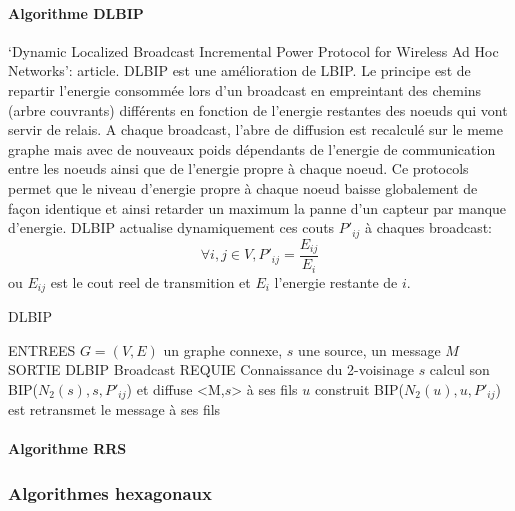 

\paragraph{Algorithme DLBIP}
`Dynamic Localized Broadcast Incremental Power Protocol for Wireless Ad Hoc Networks': article\cite{Champ2009DLBIP}.
DLBIP est une amélioration de LBIP. Le principe est de repartir l'energie consommée lors d'un broadcast en empreintant des chemins (arbre couvrants) différents en fonction de l'energie restantes des noeuds qui vont servir de relais.
A chaque broadcast, l'abre de diffusion est recalculé sur le meme graphe mais avec de nouveaux poids dépendants de l'energie de communication entre les noeuds ainsi que de l'energie propre à chaque noeud. Ce protocols permet que
le niveau d'energie propre à chaque noeud baisse globalement de façon identique et ainsi retarder un maximum la panne d'un capteur par manque d'energie.
DLBIP actualise dynamiquement ces couts $P'_{ij}$ à chaques broadcast:
$$ \forall i,j \in V, P'_{ij}=\frac{E_{ij}}{E_i}$$
ou $E_{ij}$ est le cout reel de transmition et $E_i$ l'energie restante de $i$.


\begin{algorithm}[h]
\caption{DLBIP}
\label{algo_DLBIP}
\begin{algorithmic}
\STATE ENTREES  $G=(V,E)$ un graphe connexe, $s$ une source, un message $M$
\STATE SORTIE  DLBIP Broadcast
\STATE REQUIE  Connaissance du 2-voisinage
\STATE $s$ calcul son BIP($N_2(s),s,P'_{ij}$) et diffuse <M,$s$> à ses fils
		\STATE $u$ construit BIP($N_2(u),u,P'_{ij}$) est retransmet le message à ses fils
	\ENDIF
\ENDIF
\end{algorithmic}
\end{algorithm}



\paragraph{Algorithme RRS}
\cite{Cartigny2003RNG}


\subsubsection{Algorithmes hexagonaux}


